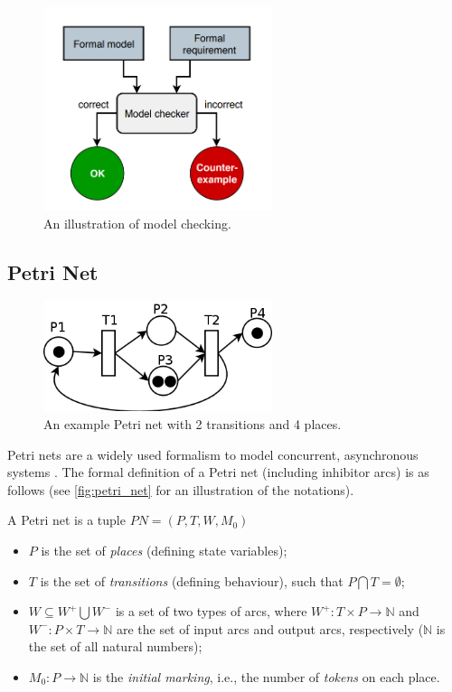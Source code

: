 \begin{figure}[!ht]
	\centering
	\includegraphics[width=67mm, keepaspectratio]{figures/model_checking.png}\hspace{1cm}
	\caption{An illustration of model checking.}
	\label{fig:model_checking}
\end{figure}

\subsection{Petri Net}

\begin{figure}[!ht]
	\centering
	\includegraphics[width=67mm, keepaspectratio]{figures/petri_net.png}\hspace{1cm}
	\caption{An example Petri net with 2 transitions and 4 places.}
	\label{fig:petri_net}
\end{figure}

Petri nets are a widely used formalism to model concurrent, asynchronous systems \cite{24143}. The formal definition of a Petri net (including inhibitor arcs) is as follows (see \autoref{fig:petri_net} for an illustration of the notations).

\begin{definition}
	
	A Petri net is a tuple \( PN = (P, T, W, M_0) \)
	
	\begin{itemize}
		\item \(P\) is the set of \emph{places} (defining state variables);
		\item \(T\) is the set of \emph{transitions} (defining behaviour), such that \( P \bigcap T = \emptyset \);
		\item \(W \subseteq W^+ \bigcup W^- \) is a set of two types of arcs, where \(  W^+ : T \times P \rightarrow \mathbb{N}\) and \( W^- : P \times T \rightarrow \mathbb{N} \) are the set of input arcs and output arcs, respectively (\( \mathbb{N} \) is the set of all natural numbers);
		\item \(M_0 : P \rightarrow \mathbb{N} \) is the \emph{initial marking}, i.e., the number of \emph{tokens} on each place.
	\end{itemize}
\end{definition}

